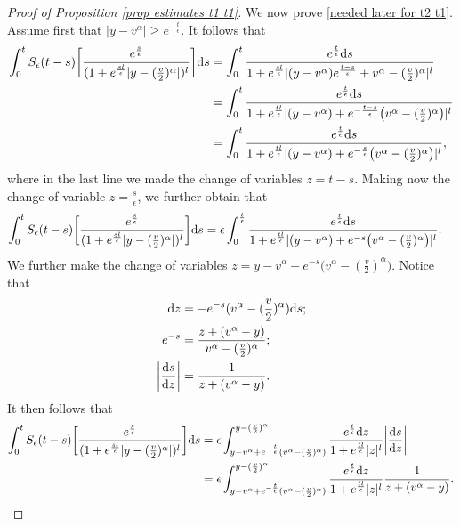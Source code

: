 \documentclass[11pt]{article}
\numberwithin{equation}{section}
\newcommand{\der}{\textup{d}}
\begin{document}
\begin{proof}[Proof of Proposition 
\ref{prop estimates t1 t1}]
  
  We now prove \eqref{needed later for t2 t1}. Assume first that $|y-v^{\alpha}|\geq e^{-\frac{t}{\epsilon}}$. It follows that
  \begin{align*}
      \int_{0}^{t}S_{\epsilon}(t-s)\bigg[\frac{e^{\frac{s}{\epsilon}}}{(1+e^{\frac{sl}{\epsilon}}|y-(\frac{v}{2})^{\alpha}|)^{l}}\bigg]\der s&=\int_{0}^{t}\frac{e^{\frac{t}{\epsilon}}\der s}{1+e^{\frac{sl}{\epsilon}}|(y-v^{\alpha})e^{\frac{t-s}{\epsilon}}+v^{\alpha}-(\frac{v}{2})^{\alpha}|^{l}}\\
      &=\int_{0}^{t}\frac{e^{\frac{t}{\epsilon}}\der s}{1+e^{\frac{tl}{\epsilon}}|(y-v^{\alpha})+e^{-\frac{t-s}{\epsilon}}\big(v^{\alpha}-(\frac{v}{2})^{\alpha}\big)|^{l}}\\
      &=\int_{0}^{t}\frac{e^{\frac{t}{\epsilon}}\der s}{1+e^{\frac{tl}{\epsilon}}|(y-v^{\alpha})+e^{-\frac{s}{\epsilon}}\big(v^{\alpha}-(\frac{v}{2})^{\alpha}\big)|^{l}},
  \end{align*}
where in the last line we made the change of variables $z=t-s$. Making now the change of variable $z=\frac{s}{\epsilon}$, we further obtain that
 \begin{align*}
      \int_{0}^{t}S_{\epsilon}(t-s)\bigg[\frac{ e^{\frac{s}{\epsilon}}}{(1+e^{\frac{sl}{\epsilon}}|y-(\frac{v}{2})^{\alpha}|)^{l}}\bigg]\der s&=\epsilon \int_{0}^{\frac{t}{\epsilon}}\frac{e^{\frac{t}{\epsilon}}\der s}{1+e^{\frac{tl}{\epsilon}}|(y-v^{\alpha})+e^{-s}\big(v^{\alpha}-(\frac{v}{2})^{\alpha}\big)|^{l}}.
  \end{align*}
We further make the change of variables $z=y-v^{\alpha}+e^{-s}\big(v^{\alpha}-(\frac{v}{2})^{\alpha}\big)$. Notice that
\begin{align*}
    \der z &= -e^{-s}(v^{\alpha}-(\frac{v}{2})^{\alpha})\der s;\\
    e^{-s} &=\frac{z+(v^{\alpha}-y)}{v^{\alpha}-(\frac{v}{2})^{\alpha}};\\
    \bigg|\frac{\der s}{\der z}\bigg|&=\frac{1}{z+(v^{\alpha}-y)}.
\end{align*}
It then follows that
\begin{align*}
      \int_{0}^{t}S_{\epsilon}(t-s)\bigg[\frac{ e^{\frac{s}{\epsilon}}}{(1+e^{\frac{sl}{\epsilon}}|y-(\frac{v}{2})^{\alpha}|)^{l}}\bigg]\der s&=\epsilon \int_{y-v^{\alpha}+e^{-\frac{t}{\epsilon}}(v^{\alpha}-(\frac{v}{2})^{\alpha})}^{y-(\frac{v}{2})^{\alpha}}\frac{e^{\frac{t}{\epsilon}}\der z}{1+e^{\frac{tl}{\epsilon}}|z|^{l}}\bigg|\frac{\der s}{\der z}\bigg|\\
      &=\epsilon \int_{y-v^{\alpha}+e^{-\frac{t}{\epsilon}}(v^{\alpha}-(\frac{v}{2})^{\alpha})}^{y-(\frac{v}{2})^{\alpha}}\frac{e^{\frac{t}{\epsilon}}\der z}{1+e^{\frac{tl}{\epsilon}}|z|^{l}}\frac{1}{z+(v^{\alpha}-y)}.

\end{align*}
\end{proof}
\end{document}
